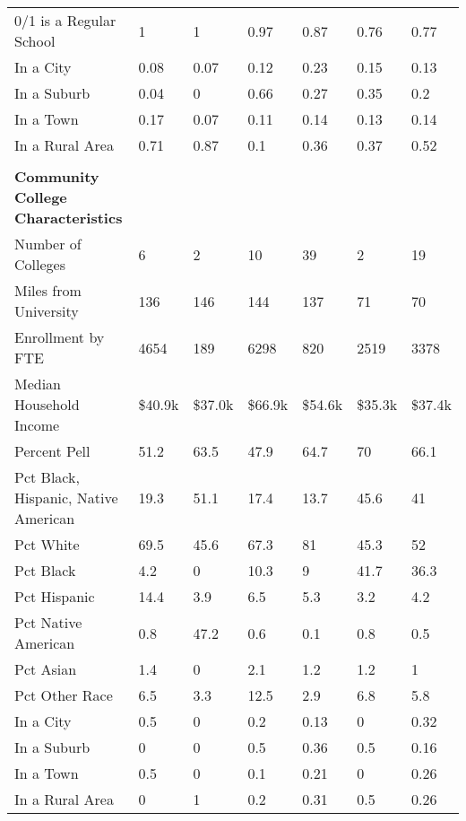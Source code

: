 \begin{longtabu}{X[4.5,l] X[1,c] X[1,c] X[1,c] X[1,c] X[1,c] X[1,c]}
\hspace{0.4cm}0/1 is a Regular School&1&1&0.97&0.87&0.76&0.77\\%
\hspace{0.4cm}In a City&0.08&0.07&0.12&0.23&0.15&0.13\\%
\hspace{0.4cm}In a Suburb&0.04&0&0.66&0.27&0.35&0.2\\%
\hspace{0.4cm}In a Town&0.17&0.07&0.11&0.14&0.13&0.14\\%
\hspace{0.4cm}In a Rural Area&0.71&0.87&0.1&0.36&0.37&0.52\\%
&&&&&&\\%
\textbf{Community College Characteristics}&\textbf{}&\textbf{}&\textbf{}&\textbf{}&\textbf{}&\textbf{}\\%
\hspace{0.4cm}Number of Colleges&6&2&10&39&2&19\\%
\hspace{0.4cm}Miles from University&136&146&144&137&71&70\\%
\hspace{0.4cm}Enrollment by FTE&4654&189&6298&820&2519&3378\\%
\hspace{0.4cm}Median Household Income&\$40.9k&\$37.0k&\$66.9k&\$54.6k&\$35.3k&\$37.4k\\%
\hspace{0.4cm}Percent Pell&51.2&63.5&47.9&64.7&70&66.1\\%
\hspace{0.4cm}Pct Black, Hispanic, Native American&19.3&51.1&17.4&13.7&45.6&41\\%
\hspace{0.4cm}Pct White&69.5&45.6&67.3&81&45.3&52\\%
\hspace{0.4cm}Pct Black&4.2&0&10.3&9&41.7&36.3\\%
\hspace{0.4cm}Pct Hispanic&14.4&3.9&6.5&5.3&3.2&4.2\\%
\hspace{0.4cm}Pct Native American&0.8&47.2&0.6&0.1&0.8&0.5\\%
\hspace{0.4cm}Pct Asian&1.4&0&2.1&1.2&1.2&1\\%
\hspace{0.4cm}Pct Other Race&6.5&3.3&12.5&2.9&6.8&5.8\\%
\hspace{0.4cm}In a City&0.5&0&0.2&0.13&0&0.32\\%
\hspace{0.4cm}In a Suburb&0&0&0.5&0.36&0.5&0.16\\%
\hspace{0.4cm}In a Town&0.5&0&0.1&0.21&0&0.26\\%
\hspace{0.4cm}In a Rural Area&0&1&0.2&0.31&0.5&0.26\\%
\end{longtabu}
\newpage
